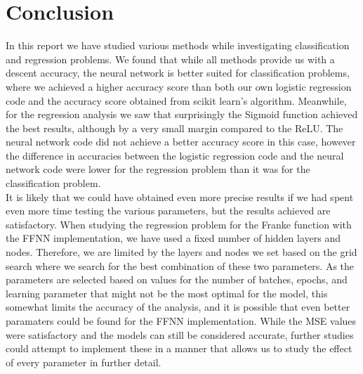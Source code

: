 \documentclass[english,notitlepage,reprint,nofootinbib]{revtex4-2}  %
\begin{document}
\section{Conclusion}\label{sec:conclusion}
In this report we have studied various methods while investigating classification and regression problems. 
We found that while all methods provide us with a descent accuracy, the neural network is better suited for classification problems, where we achieved a higher accuracy score than both our own logistic regression code and the accuracy score obtained from scikit learn's algorithm. Meanwhile, for the regression analysis we saw that surprisingly the Sigmoid function achieved the best results, although by a very small margin compared to the ReLU. The neural network code did not achieve a better accuracy score in this case, however the difference in accuracies between the logistic regression code and the neural network code were lower for the regression problem than it was for the classification problem. 
\vspace{3mm}
\\ 
It is likely that we could have obtained even more precise results if we had spent even more time testing the various parameters, but the results achieved are satisfactory. 
When studying the regression problem for the Franke function with the FFNN implementation, we have used a fixed number of hidden layers and nodes. Therefore, we are limited by the layers and nodes we set based on the grid search where we search for the best combination of these two parameters. As the parameters are selected based on values for the number of batches, epochs, and learning parameter that might not be the most optimal for the model, this somewhat limits the accuracy of the analysis, and it is possible that even better paramaters could be found for the FFNN implementation. While the MSE values were satisfactory and the models can still be considered accurate, further studies could attempt to implement these in a manner that allows us to study the effect of every parameter in further detail. 


\end{document}
